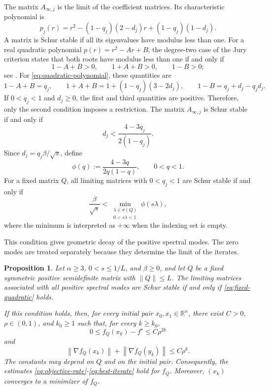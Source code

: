 \documentclass[11pt]{article}
\theoremstyle{plain}
\newtheorem{proposition}[theorem]{Proposition}
\theoremstyle{definition}
\newcommand{\R}{\mathbb{R}}
\newcommand{\norm}[1]{\left\lVert #1\right\rVert}
\begin{document}
{$$$$
The matrix $A_{\infty,j}$ is the limit of the coefficient matrices. Its
characteristic polynomial is
\begin{equation}
\label{eq:quadratic-polynomial}
p_j(r)=r^2-(1-q_j)(2-d_j)r+(1-q_j)(1-d_j).
\end{equation}
A matrix is Schur stable if all its eigenvalues have modulus less than one.
For a real quadratic polynomial $p(r)=r^2-Ar+B$, the degree-two case of the
Jury criterion states that both roots have modulus less than one if and only
if
$$
1-A+B>0,
\qquad
1+A+B>0,
\qquad
1-B>0;
$$
see \cite[p.~146, case $n=2$]{Jury}. For
\eqref{eq:quadratic-polynomial}, these quantities are
$$
1-A+B=q_j,
\qquad
1+A+B=1+(1-q_j)(3-2d_j),
\qquad
1-B=q_j+d_j-q_jd_j.
$$
If $0<q_j<1$ and $d_j\geq0$, the first and third quantities are positive.
Therefore, only the second condition imposes a restriction. The matrix
$A_{\infty,j}$ is Schur stable if and only if
\begin{equation}
\label{eq:exact-modal}
d_j<\frac{4-3q_j}{2(1-q_j)}.
\end{equation}
Since $d_j=q_j\beta/\sqrt{s}$, define
$$
\phi(q):=\frac{4-3q}{2q(1-q)},
\qquad 0<q<1.
$$
For a fixed matrix $Q$, all limiting matrices with $0<q_j<1$ are Schur stable
if and only if
\begin{equation}
\label{eq:fixed-quadratic}
\frac{\beta}{\sqrt{s}}<
\min_{\substack{\lambda\in\sigma(Q)\\0<s\lambda<1}}
\phi(s\lambda),
\end{equation}
where the minimum is interpreted as $+\infty$ when the indexing set is empty.

This condition gives geometric decay of the positive spectral modes. The zero
modes are treated separately because they determine the limit of the
iterates.

\begin{proposition}
\label{prop:fixed-quadratic}
Let $\alpha\geq3$, $0<s\leq1/L$, and $\beta\geq0$, and let $Q$ be a fixed
symmetric positive semidefinite matrix with $\norm{Q}\leq L$. The limiting
matrices associated with all positive spectral modes are Schur stable if and
only if \eqref{eq:fixed-quadratic} holds.

If this condition holds, then, for every initial pair $x_0,x_1\in\R^n$,
there exist $C>0$, $\rho\in(0,1)$, and $k_0\geq1$ such that, for every
$k\geq k_0$,
\begin{equation}
\label{eq:quadratic-geometric}
0\leq f_Q(x_k)-f^\star\leq C\rho^{2k}
\end{equation}
and
\begin{equation}
\label{eq:quadratic-gradient-geometric}
\norm{\nabla f_Q(x_k)}+\norm{\nabla f_Q(y_k)}
\leq C\rho^k.
\end{equation}
The constants may depend on $Q$ and on the initial pair.
Consequently, the estimates
\eqref{eq:objective-rate}-\eqref{eq:best-iterate} hold for $f_Q$.
Moreover, $(x_k)$ converges to a minimizer of $f_Q$.
\end{proposition}

}
\end{document}
